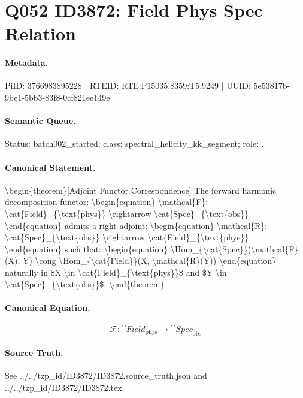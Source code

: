 \section*{Q052 ID3872: Field Phys Spec Relation}
\paragraph{Metadata.}
PiID: 3766983895228 | RTEID: RTE:P15035.8359:T5.9249 | UUID: 5e53817b-9be1-5bb3-83f8-0cf821ee149e

\paragraph{Semantic Queue.}
Status: batch002\_started; class: spectral\_helicity\_kk\_segment; role: .

\paragraph{Canonical Statement.}
\textbackslash{}begin\{theorem\}[Adjoint Functor Correspondence] The forward harmonic decomposition functor: \textbackslash{}begin\{equation\} \textbackslash{}mathcal\{F\}: \textbackslash{}cat\{Field\}\_\{\textbackslash{}text\{phys\}\} \textbackslash{}rightarrow \textbackslash{}cat\{Spec\}\_\{\textbackslash{}text\{obs\}\} \textbackslash{}end\{equation\} admits a right adjoint: \textbackslash{}begin\{equation\} \textbackslash{}mathcal\{R\}: \textbackslash{}cat\{Spec\}\_\{\textbackslash{}text\{obs\}\} \textbackslash{}rightarrow \textbackslash{}cat\{Field\}\_\{\textbackslash{}text\{phys\}\} \textbackslash{}end\{equation\} such that: \textbackslash{}begin\{equation\} \textbackslash{}Hom\_\{\textbackslash{}cat\{Spec\}\}(\textbackslash{}mathcal\{F\}(X), Y) \textbackslash{}cong \textbackslash{}Hom\_\{\textbackslash{}cat\{Field\}\}(X, \textbackslash{}mathcal\{R\}(Y)) \textbackslash{}end\{equation\} naturally in \$X \textbackslash{}in \textbackslash{}cat\{Field\}\_\{\textbackslash{}text\{phys\}\}\$ and \$Y \textbackslash{}in \textbackslash{}cat\{Spec\}\_\{\textbackslash{}text\{obs\}\}\$. \textbackslash{}end\{theorem\}

\paragraph{Canonical Equation.}
\[
\begin{equation} \mathcal{F}: \cat{Field}_{\text{phys}} \rightarrow \cat{Spec}_{\text{obs}} \end{equation}
\]

\paragraph{Source Truth.}
See ../../tzp\_id/ID3872/ID3872.source\_truth.json and ../../tzp\_id/ID3872/ID3872.tex.
